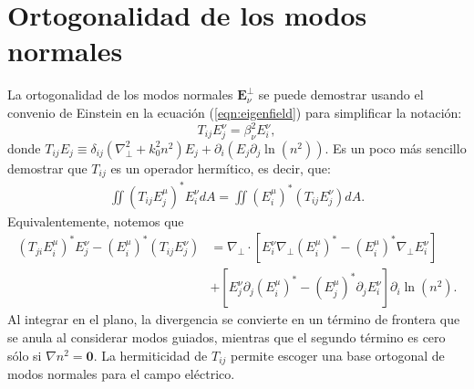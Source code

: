 \chapter{Ortogonalidad de los modos normales \label{sec:orto}}

La ortogonalidad de los modos normales $\textbf{E}_\nu^\perp$ se puede demostrar usando el convenio de Einstein en la ecuación (\ref{eqn:eigenfield}) para simplificar la notación:
\begin{equation}
	T_{ij} E^\nu_j = \beta_\nu^2 E^\nu_i, \label{eqn:eigentensorial}
\end{equation}
donde $T_{ij}E_j \equiv \delta_{ij}\left(\nabla_\perp^2 + k_0^2n^2\right)E_j+\partial_i \left(E_j  \partial_j\ln(n^2) \right) $. Es un poco más sencillo demostrar que $T_{ij}$ es un operador hermítico, es decir, que:
\begin{align*}
	\iint \left(T_{ij} E_j^\mu \right)^*  E_i^\nu dA = \iint \left( E_i^\mu \right)^*  \left(T_{ij} E_j^\nu\right) dA .
\end{align*}
Equivalentemente, notemos que
\begin{align*}
	\left(T_{ji} E_i^\mu \right)^* E_j^\nu  - \left( E_i^\mu \right)^*  \left(T_{ij} E_j^\nu \right) &= \nabla_\perp \cdot \left[E_i^\nu \nabla_\perp \left( E_i^\mu \right)^* - \left( E_i^\mu \right)^* \nabla_\perp E_i^\nu \right] 
	\\	
	&+ \left[E^\nu_j \partial_j \left( E_i^\mu \right)^*  - \left( E_j^\mu \right)^* \partial_j  E_i^\nu \right] \partial_i \ln(n^2).  
\end{align*}
Al integrar en el plano, la divergencia se convierte en un término de frontera que se anula al considerar modos guiados, mientras que el segundo término es cero sólo si $\nabla n^2 = \textbf{0}$. La hermiticidad de $T_{ij}$ permite escoger una base ortogonal de modos normales para el campo eléctrico.